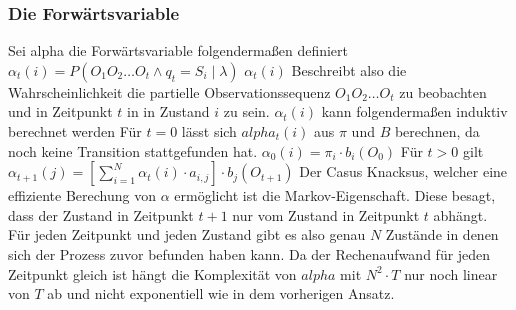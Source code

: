 \subsubsection*{Die Forwärtsvariable}
Sei alpha die Forwärtsvariable folgendermaßen definiert
$\alpha_t(i) = P(O_1 O_2 \dots O_t \wedge q_t = S_i \mid \lambda)$
$\alpha_t(i)$ Beschreibt also die Wahrscheinlichkeit die partielle Observationssequenz
$O_1 O_2 \dots O_t$ zu beobachten und in Zeitpunkt $t$ in in Zustand $i$ zu sein.
$\alpha_t(i)$ kann folgendermaßen induktiv berechnet werden
Für $t=0$ lässt sich $alpha_t(i)$ aus $\pi$ und $B$ berechnen, da noch keine Transition 
stattgefunden hat. 
$\alpha_0(i) = \pi_i \cdot b_i(O_0)$
Für $t>0$ gilt
$\alpha_{t+1}(j) = \left[ \sum_{i=1}^{N} \alpha_t(i) \cdot a_{i,j} \right] \cdot b_j(O_{t+1})$
Der Casus Knacksus, welcher eine effiziente Berechung von $\alpha$ ermöglicht ist die Markov-Eigenschaft.
Diese besagt, dass der Zustand in Zeitpunkt $t+1$ nur vom Zustand in Zeitpunkt $t$ abhängt.
Für jeden Zeitpunkt und jeden Zustand gibt es also genau $N$ Zustände in denen sich
der Prozess zuvor befunden haben kann. Da der Rechenaufwand für jeden Zeitpunkt gleich ist hängt die Komplexität von
$alpha$ mit $N^2 \cdot T$ nur noch linear von $T$ ab und nicht exponentiell wie in dem vorherigen Ansatz.